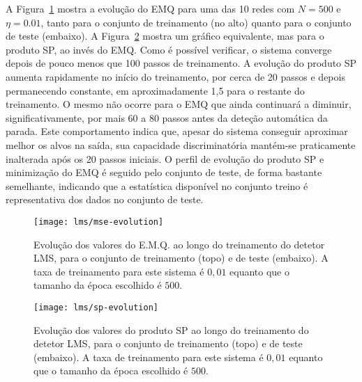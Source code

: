 A Figura~\ref{fig:lms-mse-evo} mostra a evolução do EMQ para uma das 10 redes
com $N = 500$ e $\eta = 0.01$, tanto para o conjunto de treinamento (no alto)
quanto para o conjunto de teste (embaixo). A Figura~\ref{fig:lms-sp-evo}
mostra um gráfico equivalente, mas para o produto SP, ao invés do EMQ. Como é
possível verificar, o sistema converge depois de pouco menos que 100 passos de
treinamento. A evolução do produto SP aumenta rapidamente no início do
treinamento, por cerca de 20 passos e depois permanecendo constante, em
aproximadamente 1,5 para o restante do treinamento. O mesmo não ocorre para o
EMQ que ainda continuará a diminuir, significativamente, por mais 60 a 80
passos antes da deteção automática da parada. Este comportamento indica que,
apesar do sistema conseguir aproximar melhor os alvos na saída, sua capacidade
discriminatória mantém-se praticamente inalterada após os 20 passos
iniciais. O perfil de evolução do produto SP e minimização do EMQ é seguido
pelo conjunto de teste, de forma bastante semelhante, indicando que a
estatística disponível no conjunto treino é representativa dos dados no
conjunto de teste.


\begin{figure}
\begin{center}
\texttt{[image: lms/mse-evolution]}
\end{center}
\caption{Evolução dos valores do E.M.Q. ao longo do treinamento do detetor
LMS, para o conjunto de treinamento (topo) e de teste (embaixo). A taxa de
treinamento para este sistema é $0,01$ equanto que o tamanho da época
escolhido é $500$.}
\label{fig:lms-mse-evo}
\end{figure}

\begin{figure}
\begin{center}
\texttt{[image: lms/sp-evolution]}
\end{center}
\caption{Evolução dos valores do produto SP ao longo do treinamento do detetor
LMS, para o conjunto de treinamento (topo) e de teste (embaixo). A taxa de
treinamento para este sistema é $0,01$ equanto que o tamanho da época
escolhido é $500$.}
\label{fig:lms-sp-evo}
\end{figure}

